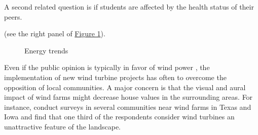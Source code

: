 \documentclass[twoside,12pt]{article}
\begin{document}
A second related question is if students are affected by the health status of their peers.

 (see the right panel of \hyperref[windcapacity]{Figure 1}). 
\begin{figure}[h]\label{windcapacity}
\centering
{}\hspace{1em}
\caption{Energy trends}
\end{figure}
Even if the public opinion is typically in favor of wind power \citep{firestone2007public}, the implementation of new wind turbine projects has often to overcome the opposition of local communities. A major concern is that the visual and aural impact of wind farms might decrease house values in the surrounding areas. For instance, \cite{slattery2012predominance} conduct surveys in several communities near wind farms in Texas and Iowa and find that one third of the respondents consider wind turbines an unattractive feature of the landscape. 
\end{document}
